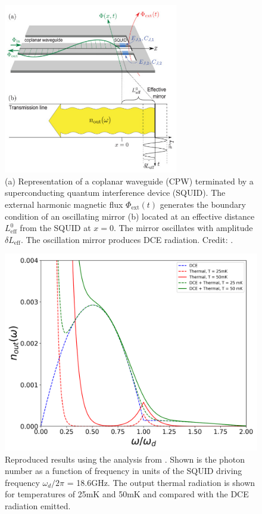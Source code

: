 \begin{figure}
    \includegraphics[width=3in, keepaspectratio]{figures/intro/Johansson2010_effectivemirror.png}
    \caption{(a) Representation of a coplanar waveguide (CPW) terminated by a superconducting quantum interference device (SQUID). 
    The external harmonic magnetic flux $\Phi_{\text{ext}}(t)$ generates 
    the boundary condition of an oscillating mirror (b) located at an effective distance $L^0_{\text{eff}}$ from the SQUID at $x=0$. The mirror oscillates with amplitude $\delta L_{\text{eff}}$. The oscillation mirror produces DCE radiation. Credit: \protect\cite{Johansson2010}.}
    \label{fig:Johansson2010_effectivemirror}
\end{figure}


\begin{figure}
    \includegraphics[width=6.5in,keepaspectratio]{figures/intro/reproduced_Johansson.png}
    \caption{Reproduced results using the analysis from \protect\cite{Johansson2010}. 
    Shown is the photon number as a function of frequency in units of the SQUID driving frequency $\omega_d / 2\pi$ = 18.6GHz. The output thermal radiation is shown for temperatures of 25mK and 50mK and compared with the DCE radiation emitted.}
    \label{fig:Johansson2010_reproduced}
\end{figure}

